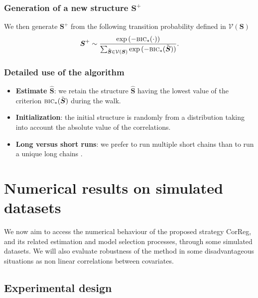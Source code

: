 \documentclass[11pt,a4paper]{article}
\begin{document}
	\subsubsection{Generation of a new structure $\boldsymbol{S}^+$}
	
We then generate $\boldsymbol{S}^+$ from the following transition probability defined in  $\mathcal{V}(\boldsymbol{S})$
	\begin{equation}
	\boldsymbol{S}^+ \sim \frac{\exp{(-\mbox{{\sc bic}}_*(\cdot))}}{\sum_{\tilde{\boldsymbol{S}}\in \mathcal{V}(\boldsymbol{S})}\exp{(-\mbox{{\sc bic}}_*(\tilde{\boldsymbol{S}}))}}.
	\end{equation}
	
 \subsubsection{Detailed use of the algorithm}

\begin{itemize}
\item {\bf Estimate $\hat{\boldsymbol{S}}$}: we retain the structure $\hat{\boldsymbol{S}}$ having the lowest value of the criterion $\mbox{{\sc bic}}_*(\tilde{\boldsymbol{S}})$ during the walk.
\item {\bf Initialization}: the initial structure is randomly from a distribution taking into account the absolute value of the correlations.
\item {\bf Long versus short runs}: we prefer to run multiple short chains than to run a unique long chains \cite{gilks1996markov}.
\end{itemize} 
	
\section{Numerical results on simulated datasets} \label{sectionsimul}

We now aim to access the numerical behaviour of the proposed strategy {\sc CorReg}, and its related estimation and model selection processes, through some simulated datasets. We will also evaluate robustness of the method in some disadvantageous situations as non linear correlations between covariates.

	\subsection{Experimental design}
	
\end{document}
